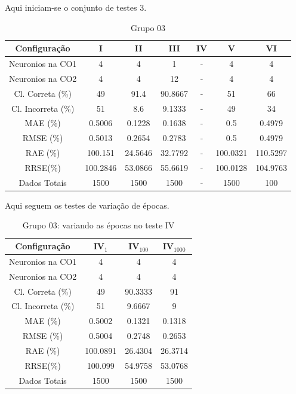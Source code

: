 \documentclass[journal, a4paper]{IEEEtran}
\begin{document}
Aqui iniciam-se o conjunto de testes 3. 

\begin{table}[H]
	\begin{center}
		\caption{Grupo $03$}
		\label{grupo03}
		\begin{tabular}{|c|c|c|c|c|c|c|}\hline	
			\textbf{Configuração} &\textbf{I}&\textbf{II}&\textbf{III}&\textbf{IV}&\textbf{V}&\textbf{VI} \\ \hline 
			{Neuronios na CO1} & 4 & 4 & 1 & - & 4 & 4 \\ \hline
			{Neuronios na CO2} & 4 & 4 & 12 & - & 4 & 4 \\ \hline
			{Cl. Correta (\%)} & 49  & 91.4  & 90.8667  & - & 51 &  66 \\ \hline
			{Cl. Incorreta (\%)} & 51  & 8.6 & 9.1333 & - & 49 & 34 \\ \hline
			{MAE (\%)} & 0.5006 &  0.1228 & 0.1638 & - & 0.5  &  0.4979 \\ \hline
			{RMSE (\%)} & 0.5013 & 0.2654 & 0.2783 & - & 0.5 & 0.4979 \\ \hline
			{RAE (\%)} & 100.151 & 24.5646 & 32.7792 & - & 100.0321 & 110.5297 \\ \hline
			{RRSE(\%)} & 100.2846 & 53.0866 & 55.6619 & - & 100.0128 & 104.9763 \\ \hline
			{Dados Totais} & 1500 & 1500  & 1500 & - & 1500 & 100 \\ \hline
		\end{tabular}  
	\end{center}
\end{table}

Aqui seguem os testes de variação de épocas. 

\begin{table}[H]
	\begin{center}
		\caption{Grupo $03$: variando as épocas no teste IV}
		\label{grupo03IV}
		\begin{tabular}{|c|c|c|c|}\hline	
			\textbf{Configuração} &$\textbf{IV}_{1}$&$\textbf{IV}_{100}$&$\textbf{IV}_{1000}$ \\ \hline 
			{Neuronios na CO1}   & 4      & 4     & 4      \\ \hline
			{Neuronios na CO2}   & 4      & 4     & 4      \\ \hline
			{Cl. Correta (\%)}   & 49    & 90.3333  & 91  \\ \hline
			{Cl. Incorreta (\%)} & 51    & 9.6667   & 9   \\ \hline
			{MAE (\%)}           & 0.5002   & 0.1321  & 0.1318   \\ \hline
			{RMSE (\%)}          & 0.5004   & 0.2748  & 0.2653   \\ \hline
			{RAE (\%)}           & 100.0891  & 26.4304 & 26.3714   \\ \hline
			{RRSE(\%)}           & 100.099 & 54.9758 & 53.0768  \\ \hline
			{Dados Totais}       & 1500   & 1500  & 1500   \\ \hline
		\end{tabular}  
	\end{center}
\end{table}
\end{document}
